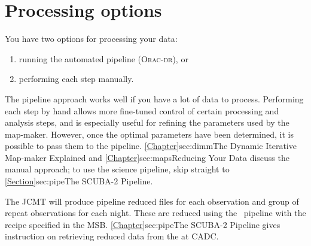 \section{Processing options}

You have two options for processing your data:

\begin{enumerate}
\item running the automated pipeline (\textsc{Orac-dr}), or
\item performing each step manually.
\end{enumerate}

The pipeline approach works well if you have a lot of data to process.
Performing each step by hand allows more fine-tuned control of certain
processing and analysis steps, and is especially useful for refining
the parameters used by the map-maker. However, once the optimal
parameters have been determined, it is possible to pass them to the
pipeline. \cref{Chapter}{sec:dimm}{The Dynamic Iterative Map-maker
  Explained} and \cref{Chapter}{sec:maps}{Reducing Your Data} discuss
the manual approach; to use the science pipeline, skip straight to
\cref{Section}{sec:pipe}{The SCUBA-2 Pipeline}.

The JCMT will produce pipeline reduced files for each observation and
group of repeat observations for each night. These are reduced using
the \oracdr\ pipeline with the recipe specified in the MSB.
\cref{Chapter}{sec:pipe}{The SCUBA-2 Pipeline} gives instruction on
retrieving reduced data from the  at
CADC.
